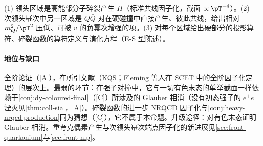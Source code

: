 \begin{proofsketch}
(1) 领头区域是高能部分子碎裂产生 $H$（标准共线因子化，截面 $\propto\pT^{-4}$）。(2) 次领头幂次中另一区域是 $Q\bar Q$ 对在硬碰撞中直接产生、彼此共线，给出相对 $m_Q^2/\pT^2$ 压低、可被 $v$ 的负幂次增强的项\cite{Fleming:2012wy}。(3) 对每个区域给出硬部分的投影算符、碎裂函数的算符定义与演化方程\cite{Kang:2011mg,Kang:2014tta,Fleming:2012wy}（E-S 型陈述）。
\end{proofsketch}

\paragraph{地位与缺口}
全阶论证（[A]），在所引文献（KQS\cite{Kang:2011mg}；Fleming 等人在 SCET 中的全阶因子化定理\cite{Fleming:2012wy}）的层次上。最弱的环节：在强子对撞中，它与一切有色末态的单举截面一样依赖于\cref{conj:dy-coloured-final}（[C]）所涉及的 Glauber 相消（没有初态强子的 $e^+e^-$ 湮灭见\cref{thm:coll-sia}，[A]）。碎裂函数的进一步 NRQCD 因子化与\cref{conj:heavy-nrqcd-production}同为猜想（[C]），它不属于本命题。升级途径：对有色末态证明 Glauber 相消。重夸克偶素产生与次领头幂次端点因子化的新进展见\cref{sec:front-quarkonium}与\cref{sec:front-nlp}。
